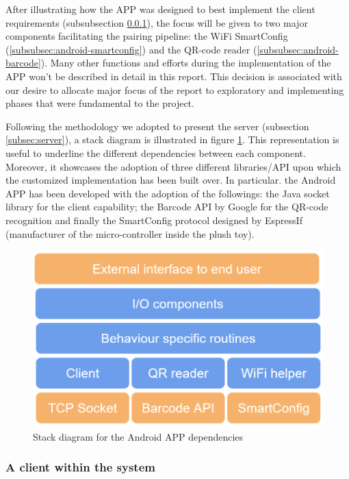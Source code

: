 \medskip
After illustrating how the APP was designed to best implement the client requirements (subsubsection \ref{subsubsec:android-client}), the focus will be given to two major components facilitating the pairing pipeline: the WiFi SmartConfig (\ref{subsubsec:android-smartconfig}) and the QR-code reader (\ref{subsubsec:android-barcode}). Many other functions and efforts during the implementation of the APP won't be described in detail in this report. This decision is associated with our desire to allocate major focus of the report to exploratory and implementing phases that were fundamental to the project. 

\newpage
Following the methodology we adopted to present the server (subsection \ref{subsec:server}), a stack diagram is illustrated in figure \ref{fig:SE_stack_android}. This representation is useful to underline the different dependencies between each component. Moreover, it showcases the adoption of three different libraries/API upon which the customized implementation has been built over. In particular. the Android APP has been developed with the adoption of the followings: the Java socket library \cite{javaTCPsocketDoc} for the client capability; the Barcode API by Google \cite{barcodeAPItutorial} for the QR-code recognition and finally the SmartConfig protocol \cite{smartconfigDoc} designed by EspressIf (manufacturer of the micro-controller inside the plush toy). 

\begin{figure}[ht]
    \centering
    \includegraphics[scale=0.45]{images/SE_android_stack.PNG}
    \caption{Stack diagram for the Android APP dependencies}
    \label{fig:SE_stack_android}
\end{figure}

\subsubsection{A client within the system}
\label{subsubsec:android-client}


